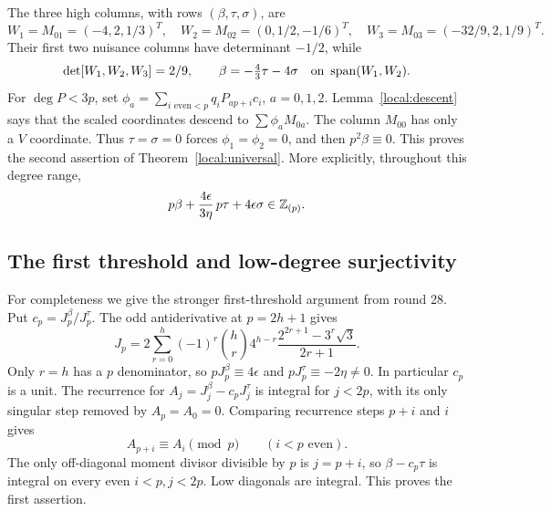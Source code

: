 \documentclass[11pt,a4paper]{article}
\numberwithin{equation}{section}
\theoremstyle{definition}\newtheorem{definition}[theorem]{Definition}
\theoremstyle{remark}\newtheorem{remark}[theorem]{Remark}
\begin{document}
The three high columns, with rows $(\beta,\tau,\sigma)$, are
\begin{equation}\label{local:small}
 W_1=M_{01}=(-4,2,1/3)^T,\quad W_2=M_{02}=(0,1/2,-1/6)^T,\quad
 W_3=M_{03}=(-32/9,2,1/9)^T.
\end{equation}
Their first two nuisance columns have determinant $-1/2$, while
\begin{equation}\label{local:dets}
 \det[W_1,W_2,W_3]=2/9,\qquad
 \beta=-\tfrac43\tau-4\sigma\quad\hbox{on }\operatorname{span}(W_1,W_2).
\end{equation}
For $\deg P<3p$, set $\phi_a=\sum_{i\text{ even}<p}q_iP_{ap+i}c_i$, $a=0,1,2$. Lemma~\ref{local:descent} says that the scaled coordinates descend to $\sum\phi_aM_{0a}$. The column $M_{00}$ has only a $V$ coordinate. Thus $\tau=\sigma=0$ forces $\phi_1=\phi_2=0$, and then $p^2\beta\equiv0$. This proves the second assertion of Theorem~\ref{local:universal}. More explicitly, throughout this degree range,
\begin{equation}\label{local:congruence}
 p\beta+\frac{4\epsilon}{3\eta}\,p\tau+4\epsilon\sigma\in\mathbb Z_{(p)}.
\end{equation}

\subsection{The first threshold and low-degree surjectivity}
For completeness we give the stronger first-threshold argument from round 28. Put $c_p=J_p^\beta/J_p^\tau$. The odd antiderivative at $p=2h+1$ gives
\[
 J_p=2\sum_{r=0}^{h}(-1)^r\binom hr4^{h-r}\frac{2^{2r+1}-3^r\sqrt3}{2r+1}.
\]
Only $r=h$ has a $p$ denominator, so $pJ_p^\beta\equiv4\epsilon$ and $pJ_p^\tau\equiv-2\eta\ne0$. In particular $c_p$ is a unit. The recurrence for
$A_j=J_j^\beta-c_pJ_j^\tau$ is integral for $j<2p$, with its only singular step removed by $A_p=A_0=0$. Comparing recurrence steps $p+i$ and $i$ gives
\[
                         A_{p+i}\equiv A_i\pmod p\qquad(i<p\text{ even}).
\]
The only off-diagonal moment divisor divisible by $p$ is $j=p+i$, so $\beta-c_p\tau$ is integral on every even $i<p,j<2p$. Low diagonals are integral. This proves the first assertion.
\end{document}
